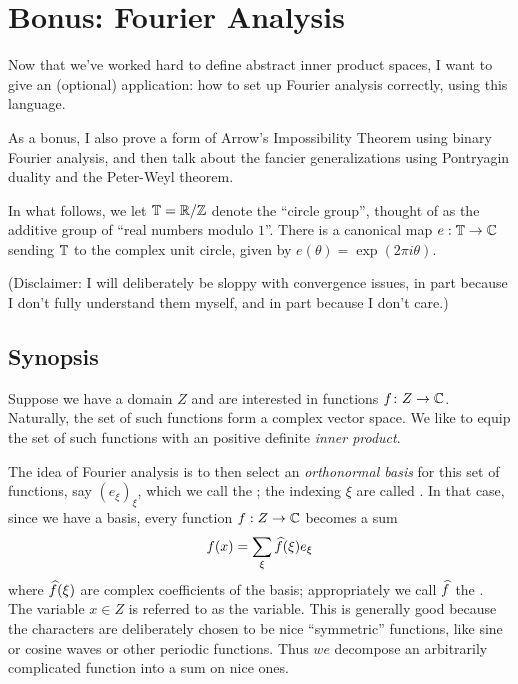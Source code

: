 \chapter{Bonus: Fourier Analysis}
Now that we've worked hard to define abstract inner product spaces,
I want to give an (optional) application:
how to set up Fourier analysis correctly,
using this language.

As a bonus, I also prove a form of Arrow's Impossibility Theorem
using binary Fourier analysis,
and then talk about the fancier generalizations using Pontryagin duality
and the Peter-Weyl theorem.

In what follows, we let $\mathbb T = \mathbb R/\mathbb Z$ denote the ``circle group'',
thought of as the additive group of ``real numbers modulo $1$''.
There is a canonical map $e : \mathbb T \to \mathbb C$ sending $\mathbb T$ to the
complex unit circle, given by $e(\theta) = \exp(2\pi i \theta)$.

(Disclaimer: I will deliberately be sloppy with convergence issues,
in part because I don't fully understand them myself,
and in part because I don't care.)

\section{Synopsis}
Suppose we have a domain $Z$ and are interested in functions $f \colon Z \to \mathbb C$.
Naturally, the set of such functions form a complex vector space.
We like to equip the set of such functions
with an positive definite \emph{inner product}.

The idea of Fourier analysis is to then select an \emph{orthonormal basis}
for this set of functions, say $(e_\xi)_{\xi}$,
which we call the ;
the indexing $\xi$ are called .
In that case, since we have a basis, every function $f : Z \to \mathbb C$
becomes a sum
\[ f(x) = \sum_{\xi} \widehat f(\xi) e_\xi \]
where $\widehat f(\xi)$ are complex coefficients of the basis;
appropriately we call $\widehat f$ the .
The variable $x \in Z$ is referred to as the  variable.
This is generally good because the characters are deliberately chosen
to be nice ``symmetric'' functions,
like sine or cosine waves or other periodic functions.
Thus $we$ decompose an arbitrarily complicated function into a sum on nice ones.


